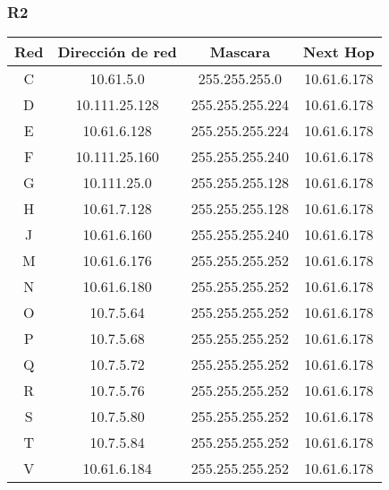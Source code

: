 \newpage
\subsubsection{R2}
\begin{table}[!htbp]
\centering
  \begin{tabular}{|c|c|c|c|}
    \hline
	Red & Dirección de red & Mascara & Next Hop\\ \hline
	C & 10.61.5.0 & 255.255.255.0 & 10.61.6.178 \\ \hline
	D & 10.111.25.128 & 255.255.255.224 & 10.61.6.178 \\ \hline
	E & 10.61.6.128 & 255.255.255.224 & 10.61.6.178 \\ \hline
	F & 10.111.25.160 & 255.255.255.240 & 10.61.6.178 \\ \hline
	G & 10.111.25.0 & 255.255.255.128 & 10.61.6.178 \\ \hline
	H & 10.61.7.128 & 255.255.255.128 & 10.61.6.178 \\ \hline
	J & 10.61.6.160 & 255.255.255.240 & 10.61.6.178 \\ \hline
	M & 10.61.6.176 & 255.255.255.252 & 10.61.6.178 \\ \hline
	N & 10.61.6.180 & 255.255.255.252 & 10.61.6.178 \\ \hline
	O & 10.7.5.64 & 255.255.255.252 & 10.61.6.178 \\ \hline
	P & 10.7.5.68 & 255.255.255.252 & 10.61.6.178 \\ \hline
	Q & 10.7.5.72 & 255.255.255.252 & 10.61.6.178 \\ \hline
	R & 10.7.5.76 & 255.255.255.252 & 10.61.6.178 \\ \hline
	S & 10.7.5.80 & 255.255.255.252 & 10.61.6.178 \\ \hline
	T & 10.7.5.84 & 255.255.255.252 & 10.61.6.178 \\ \hline
	V & 10.61.6.184 & 255.255.255.252 & 10.61.6.178 \\
    \hline
  \end{tabular}
\end{table}

\newpage
